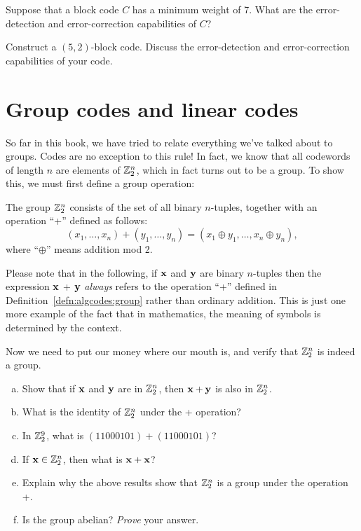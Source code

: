 \begin{exercise}{}
Suppose that a  block code $C$ has a minimum weight of 7. What are the
error-detection and error-correction capabilities of $C$?
\end{exercise}
 
 \begin{exercise}{}
Construct a $(5,2)$-block code. Discuss the error-detection and
error-correction capabilities of your code.
 \end{exercise}
 
\section{Group codes and linear codes\quad
{}}

So far in this book, we have tried to relate everything we've talked about to groups. Codes are no exception to this rule!  In fact, we know that all codewords of length $n$ are elements of ${\Bbb Z}_2^n$, which in fact turns out to be a group. To show this, we must first define a group operation:

\begin{defn}\label{defn:algcodes:group}
The group ${\Bbb Z}_2^n$ consists of the set of all binary $n$-tuples, together with an operation ``+'' defined as follows:
\[ (x_1, \ldots, x_n) +  (y_1, \ldots, y_n) = (x_1 \oplus y_1, \ldots, x_n \oplus y_n), \]
where ``$\oplus$'' means addition mod 2.
\end{defn}

\begin{rem}
Please note  that in the following, if  ${\bold x}$ and ${\bold y}$ are binary $n$-tuples then the expression ${\bold x}$ + ${\bold y}$ \emph{always} refers to the operation ``+'' defined in Definition~\ref{defn:algcodes:group} rather than ordinary addition. This is just one more example of the fact that in mathematics, the meaning of symbols is determined by the context.
\end{rem}

Now we need to put our money where our mouth is, and verify that 
${\Bbb Z}_2^n$ is indeed a group.

\begin{exercise}{}
\begin{enumerate}[(a)]
\item
Show that if ${\bold x}$ and ${\bold y}$ are in ${\Bbb Z}_2^n$, then ${\bold x} + {\bold y}$ is also in ${\Bbb Z}_2^n$.
\item
What is the identity of ${\Bbb
Z}_2^n$ under the + operation?
\item
In ${\Bbb Z}_2^9$, what is $(11000101) + (11000101)$?
\item
If ${\bold x} \in {\Bbb Z}_2^n$, then what is ${\bold x} + {\bold x}$?
\item
Explain why the above results show that ${\Bbb Z}_2^n$ is a group under the operation +.
\item
Is the group abelian? \emph{Prove} your answer.
\end{enumerate}
\end{exercise} 

